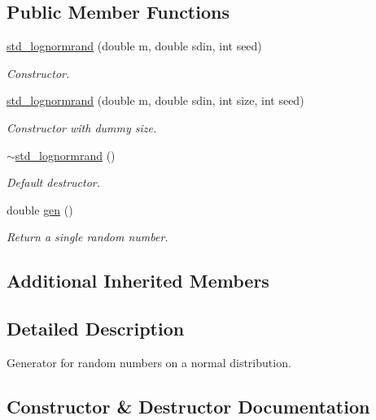 \subsection*{Public Member Functions}
\begin{DoxyCompactItemize}
\item 
\hyperlink{classstdrand_1_1std__lognormrand_a4d27599458dc5b075d723a445431d2f7}{std\+\_\+lognormrand} (double m, double sdin, int seed)
\begin{DoxyCompactList}\small\item\em Constructor. \end{DoxyCompactList}\item 
\hyperlink{classstdrand_1_1std__lognormrand_a21729248c87a39d6522a405a85b6a808}{std\+\_\+lognormrand} (double m, double sdin, int size, int seed)
\begin{DoxyCompactList}\small\item\em Constructor with dummy size. \end{DoxyCompactList}\item 
\hyperlink{classstdrand_1_1std__lognormrand_af73b651b8fde69e3535660eca7fac95f}{$\sim$std\+\_\+lognormrand} ()
\begin{DoxyCompactList}\small\item\em Default destructor. \end{DoxyCompactList}\item 
double \hyperlink{classstdrand_1_1std__lognormrand_a4521bea46b321ea53a2026eac8dc046a}{gen} ()
\begin{DoxyCompactList}\small\item\em Return a single random number. \end{DoxyCompactList}\end{DoxyCompactItemize}
\subsection*{Additional Inherited Members}


\subsection{Detailed Description}
Generator for random numbers on a normal distribution. 

\subsection{Constructor \& Destructor Documentation}

